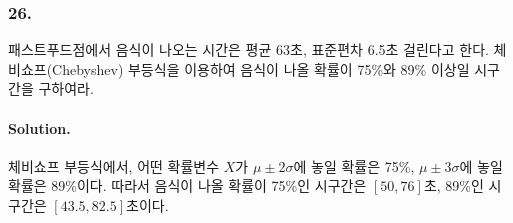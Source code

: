 \subsubsection{26.} 패스트푸드점에서 음식이 나오는 시간은 평균 63초, 표준편차 6.5초 걸린다고 한다. 체비쇼프(Chebyshev) 부등식을 이용하여 음식이 나올 확률이 75\%와 89\% 이상일 시구간을 구하여라.

\paragraph{Solution.} 체비쇼프 부등식에서, 어떤 확률변수 $X$가 $\mu \pm 2\sigma$에 놓일 확률은 75\%, $\mu \pm 3\sigma$에 놓일 확률은 89\%이다. 따라서 음식이 나올 확률이 75\%인 시구간은 $\left[50, 76\right]$초, 89\%인 시구간은 $\left[43.5, 82.5\right]$초이다.